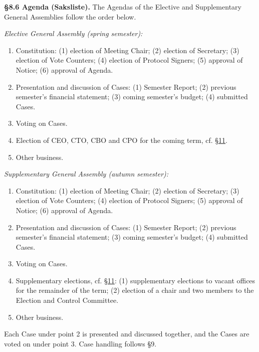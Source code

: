 \documentclass{../../../Common/Latex/Templates/rapport}
\begin{document}
\textbf{\S 8.6 Agenda (Saksliste).}\label{bylaw:8.6} The Agendas of the Elective and Supplementary General Assemblies follow the order below.

\emph{Elective General Assembly (spring semester):}
\begin{enumerate}
  \item Constitution: (1) election of Meeting Chair; (2) election of Secretary; (3) election of Vote Counters; (4) election of Protocol Signers; (5) approval of Notice; (6) approval of Agenda.
  \item Presentation and discussion of Cases: (1) Semester Report; (2) previous semester's financial statement; (3) coming semester's budget; (4) submitted Cases.
  \item Voting on Cases.
  \item Election of CEO, CTO, CBO and CPO for the coming term, cf. \hyperref[bylaw:11]{\S 11}.
  \item Other business.
\end{enumerate}

\emph{Supplementary General Assembly (autumn semester):}
\begin{enumerate}
  \item Constitution: (1) election of Meeting Chair; (2) election of Secretary; (3) election of Vote Counters; (4) election of Protocol Signers; (5) approval of Notice; (6) approval of Agenda.
  \item Presentation and discussion of Cases: (1) Semester Report; (2) previous semester's financial statement; (3) coming semester's budget; (4) submitted Cases.
  \item Voting on Cases.
  \item Supplementary elections, cf. \hyperref[bylaw:11]{\S 11}: (1) supplementary elections to vacant offices for the remainder of the term; (2) election of a chair and two members to the Election and Control Committee.
  \item Other business.
\end{enumerate}

Each Case under point 2 is presented and discussed together, and the Cases are voted on under point 3. Case handling follows \S9.
\end{document}
